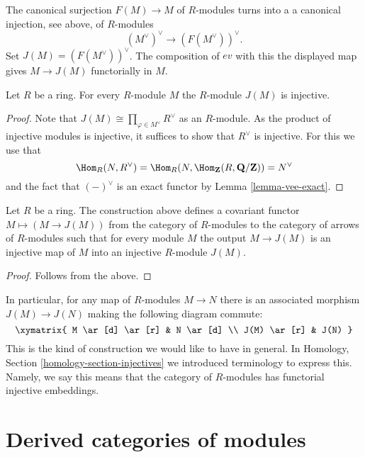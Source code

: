\noindent
The canonical surjection $F(M) \to M$ of $R$-modules turns into a
a canonical injection, see above, of $R$-modules
$$
(M^\vee)^\vee \longrightarrow (F(M^\vee))^\vee.
$$
Set $J(M) = (F(M^\vee))^\vee$. The composition of $ev$ with this
the displayed map gives $M \to J(M)$ functorially in $M$.

\begin{lemma}
\label{lemma-JM-injective}
Let $R$ be a ring. For every $R$-module $M$ the
$R$-module $J(M)$ is injective.
\end{lemma}

\begin{proof}
Note that $J(M) \cong \prod_{\varphi \in M^\vee} R^\vee$ as an $R$-module.
As the product of injective modules is injective, it suffices to
show that $R^\vee$ is injective. For this we use that
$$
\Hom_R(N, R^\vee) =
\Hom_R(N, \Hom_{\mathbf{Z}}(R, \mathbf{Q}/\mathbf{Z})) =
N^\vee
$$
and the
fact that $(-)^\vee$ is an exact functor by Lemma
\ref{lemma-vee-exact}.
\end{proof}

\begin{lemma}
\label{lemma-injectives-modules}
Let $R$ be a ring.
The construction above defines a covariant functor
$M \mapsto (M \to J(M))$ from the category of
$R$-modules to the category of arrows of $R$-modules
such that for every module $M$ the output
$M \to J(M)$ is an injective map of $M$ into
an injective $R$-module $J(M)$.
\end{lemma}

\begin{proof}
Follows from the above.
\end{proof}

\noindent
In particular, for any map of $R$-modules $M \to N$
there is an associated morphism $J(M) \to J(N)$
making the following diagram commute:
$$
\xymatrix{
M \ar[d] \ar[r] & N \ar[d] \\
J(M) \ar[r] & J(N) }
$$
This is the kind of construction we would like to have in general.
In Homology, Section \ref{homology-section-injectives}
we introduced terminology to express this. Namely,
we say this means that the category of $R$-modules
has functorial injective embeddings.











\section{Derived categories of modules}
\label{section-derived-modules}

